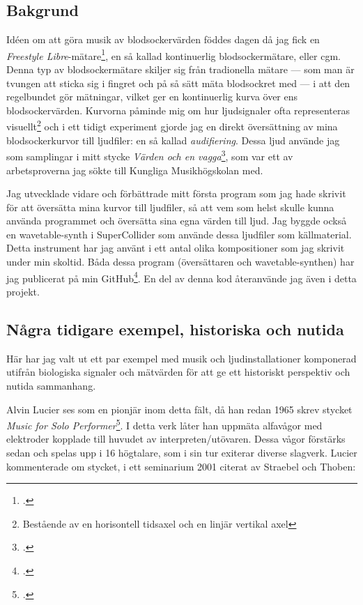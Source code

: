 \documentclass[11pt, a4paper]{article} %
\begin{document}
\subsection*{Bakgrund}
Idéen om att göra musik av blodsockervärden föddes dagen då jag fick en \emph{Freestyle Libre}-mätare\footcite{noauthor_glukosovervakningssystem_nodate}, en så kallad kontinuerlig blodsockermätare, eller \gls{cgm}. Denna typ av blodsockermätare skiljer sig från tradionella mätare --- som man är tvungen att sticka sig i fingret och på så sätt mäta blodsockret med --- i att den regelbundet gör mätningar, vilket ger en kontinuerlig kurva över ens blodsockervärden.  Kurvorna påminde mig om hur ljudsignaler ofta representeras visuellt\footnote{Bestående av en horisontell tidsaxel och en linjär vertikal axel} och i ett tidigt experiment gjorde jag en direkt översättning av mina blodsockerkurvor till ljudfiler: en så kallad \emph{audifiering}. Dessa ljud använde jag som samplingar i mitt stycke \emph{Värden och en vagga}\footcite{jondell_varden_2017}, som var ett av arbetsproverna jag sökte till Kungliga Musikhögskolan med. 

Jag utvecklade vidare och förbättrade mitt första program som jag hade skrivit för att översätta mina kurvor till ljudfiler, så att vem som helst skulle kunna använda programmet och översätta sina egna värden till ljud. Jag byggde också en wavetable-synth i SuperCollider som använde dessa ljudfiler som källmaterial. Detta instrument har jag använt i ett antal olika kompositioner som jag skrivit under min skoltid. Båda dessa program (översättaren och wavetable-synthen) har jag publicerat på min GitHub\footcite{jondell_kj-jondelldiabetes-synth_2021}. En del av denna kod återanvände jag även i detta projekt.

\subsection*{Några tidigare exempel, historiska och nutida}
Här har jag valt ut ett par exempel med musik och ljudinstallationer komponerad utifrån biologiska signaler och mätvärden för att ge ett historiskt perspektiv och nutida sammanhang.

Alvin Lucier ses som en pionjär inom detta fält, då han redan 1965 skrev stycket \emph{Music for Solo Performer}\footcite{lucier_music_1965}. I detta verk låter han uppmäta alfavågor med elektroder kopplade till huvudet av interpreten/utövaren. Dessa vågor förstärks sedan och spelas upp i 16 högtalare, som i sin tur exiterar diverse slagverk. Lucier kommenterade om stycket, i ett seminarium 2001 citerat av Straebel och Thoben:
\end{document}
